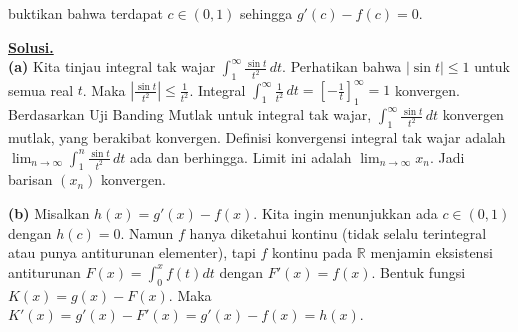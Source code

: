 \documentclass[12pt,twoside]{article}
\newenvironment{solution}
{
	\par\noindent\textbf{\underline{Solusi.}}\\
}
{
	\par
}
\begin{document}
\begin{enumerate}
\begin{enumerate}
                buktikan bahwa terdapat $c\in (0,1)$ sehingga $g'(c)-f(c)=0$.
        \end{enumerate}
        \begin{solution}
          \textbf{(a)}
          Kita tinjau integral tak wajar $\int_1^\infty \frac{\sin t}{t^2} \, dt$.
          Perhatikan bahwa $|\sin t| \le 1$ untuk semua real $t$.
          Maka $\left| \frac{\sin t}{t^2} \right| \le \frac{1}{t^2}$.
          Integral $\int_1^\infty \frac{1}{t^2} \, dt = \left[ -\frac{1}{t} \right]_1^\infty = 1$ konvergen.
          Berdasarkan Uji Banding Mutlak untuk integral tak wajar, $\int_1^\infty \frac{\sin t}{t^2} \, dt$ konvergen mutlak, yang berakibat konvergen.
          Definisi konvergensi integral tak wajar adalah $\lim_{n \to \infty} \int_1^n \frac{\sin t}{t^2} \, dt$ ada dan berhingga.
          Limit ini adalah $\lim_{n \to \infty} x_n$.
          Jadi barisan $(x_n)$ konvergen.

          \textbf{(b)}
          Misalkan $h(x) = g'(x) - f(x)$. Kita ingin menunjukkan ada $c \in (0,1)$ dengan $h(c)=0$.
          Namun $f$ hanya diketahui kontinu (tidak selalu terintegral atau punya antiturunan elementer), tapi $f$ kontinu pada $\mathbb{R}$ menjamin eksistensi antiturunan $F(x) = \int_0^x f(t) dt$ dengan $F'(x)=f(x)$.
          Bentuk fungsi $K(x) = g(x) - F(x)$. Maka $K'(x) = g'(x) - F'(x) = g'(x) - f(x) = h(x)$.


\end{solution}
\end{enumerate}
\end{document}
